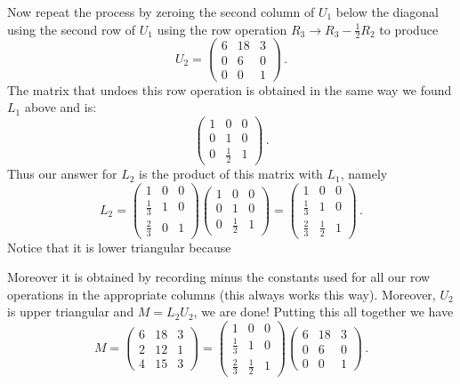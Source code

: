 Now repeat the process by zeroing the second column of $U_1$ below the diagonal using the second row of $U_1$ using the row operation
$R_3\to R_3-\frac 12 R_2$ to produce
\[U_2=\begin{pmatrix}6&18&3\\0&6&0\\0&0&1\end{pmatrix}\, .\]
The matrix that undoes this row operation is obtained in the same way we found $L_1$ above and is:
\[
\begin{pmatrix}
1&0&0\\
0&1&0\\
0&\frac 12& 1
\end{pmatrix}\, .
\]
Thus our answer for $L_2$ is the product of this matrix with $L_1$, namely
\[
L_2=
\begin{pmatrix}
1 & 0 & 0 \\[1mm]
\frac{1}{3} & 1 & 0 \\[1mm]
\frac{2}{3} & 0 & 1 
\end{pmatrix}\begin{pmatrix}
1&0&0\\
0&1&0\\
0&\frac 12& 1
\end{pmatrix}
=\begin{pmatrix}
1 & 0 & 0 \\[1mm]
\frac{1}{3} & 1 & 0 \\[1mm]
\frac{2}{3} & \frac{1}{2} & 1 
\end{pmatrix}\, .
\]
Notice that it is lower triangular because 

\begin{center}
\end{center}

\noindent
Moreover it is obtained by recording minus the constants used for all our row operations in the appropriate columns (this always works this way).
Moreover, $U_2$ is upper triangular and $M=L_2U_2$, we are done!
Putting this all together we have
\[M=\begin{pmatrix}
6 & 18 & 3 \\
2 & 12 & 1 \\
4 & 15 & 3 
\end{pmatrix}= \begin{pmatrix}
1 & 0 & 0 \\[1mm]
\frac{1}{3} & 1 & 0 \\[1mm]
\frac{2}{3} & \frac{1}{2} & 1 
\end{pmatrix}\begin{pmatrix}
6 & 18 & 3 \\[1mm]
0 & 6 & 0 \\[1mm]
0 & 0 & 1 
\end{pmatrix}\, .\]  


